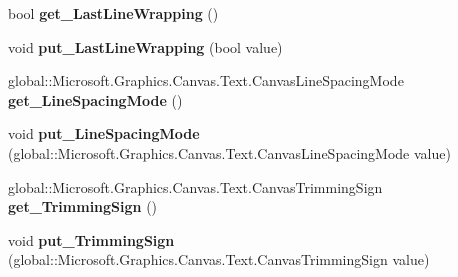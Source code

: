 \begin{DoxyCompactItemize}
\item 
\mbox{\label{interface_microsoft_1_1_graphics_1_1_canvas_1_1_text_1_1_i_canvas_text_format_adc2620964bc8e505aa61c08c6ac78893}} 
bool {\bfseries get\+\_\+\+Last\+Line\+Wrapping} ()
\item 
\mbox{\label{interface_microsoft_1_1_graphics_1_1_canvas_1_1_text_1_1_i_canvas_text_format_a3edf3bb3860fd65883e2b0a45e28b8b4}} 
void {\bfseries put\+\_\+\+Last\+Line\+Wrapping} (bool value)
\item 
\mbox{\label{interface_microsoft_1_1_graphics_1_1_canvas_1_1_text_1_1_i_canvas_text_format_ab83d69682b1282cc0203333291e4df42}} 
global\+::\+Microsoft.\+Graphics.\+Canvas.\+Text.\+Canvas\+Line\+Spacing\+Mode {\bfseries get\+\_\+\+Line\+Spacing\+Mode} ()
\item 
\mbox{\label{interface_microsoft_1_1_graphics_1_1_canvas_1_1_text_1_1_i_canvas_text_format_a1a3230a7d36b210e60927960396f0c69}} 
void {\bfseries put\+\_\+\+Line\+Spacing\+Mode} (global\+::\+Microsoft.\+Graphics.\+Canvas.\+Text.\+Canvas\+Line\+Spacing\+Mode value)
\item 
\mbox{\label{interface_microsoft_1_1_graphics_1_1_canvas_1_1_text_1_1_i_canvas_text_format_a470488d4549d1bc276b39772375c8064}} 
global\+::\+Microsoft.\+Graphics.\+Canvas.\+Text.\+Canvas\+Trimming\+Sign {\bfseries get\+\_\+\+Trimming\+Sign} ()
\item 
\mbox{\label{interface_microsoft_1_1_graphics_1_1_canvas_1_1_text_1_1_i_canvas_text_format_ac8017ec2b958d4f84c22ffd8b24319e5}} 
void {\bfseries put\+\_\+\+Trimming\+Sign} (global\+::\+Microsoft.\+Graphics.\+Canvas.\+Text.\+Canvas\+Trimming\+Sign value)
\item 
\mbox{\label{interface_microsoft_1_1_graphics_1_1_canvas_1_1_text_1_1_i_canvas_text_format_a66d3e1355a4ce968e56b2239fdcd9fc5}} 

\end{DoxyCompactItemize}
